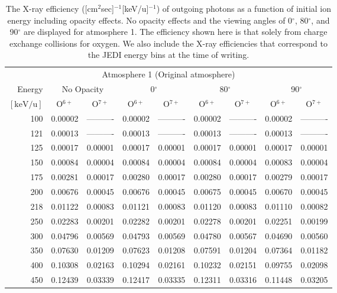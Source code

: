 \begin{table}[ht]
    \centering
    \caption{The X-ray efficiency ([cm$^2$sec]$^{-1}$[keV/u]$^{-1}$) of outgoing photons as a function of initial ion energy including opacity effects. No opacity effects and the viewing angles of 0$^\circ$, 80$^\circ$, and 90$^\circ$ are displayed for atmosphere 1. The efficiency shown here is that solely from charge exchange collisions for oxygen. We also include the X-ray efficiencies that correspond to the JEDI energy bins at the time of writing.}
    \begin{tabular}{r|c|c|c|c|c|c|c|c}
    \multicolumn{9}{c}{Atmosphere 1 (Original atmosphere)} \\ \cline{2-9}
    Energy & \multicolumn{2}{c|}{No Opacity} & \multicolumn{2}{c|}{0$^\circ$} & \multicolumn{2}{c|}{80$^\circ$} & \multicolumn{2}{c}{90$^\circ$} \\ \cline{2-9}
    $\mathrm{[keV/u]}$ & O$^{6+}$ & O$^{7+}$ & O$^{6+}$ & O$^{7+}$ & O$^{6+}$ & O$^{7+}$ & O$^{6+}$ & O$^{7+}$ \\ \cline{1-9}
      100 & 0.00002 & ---------- & 0.00002 & ---------- & 0.00002 & ---------- & 0.00002 & ---------- \\
      121 & 0.00013 & ---------- & 0.00013 & ---------- & 0.00013 & ---------- & 0.00013 & ---------- \\
      125 & 0.00017 & 0.00001 & 0.00017 & 0.00001 & 0.00017 & 0.00001 & 0.00017 & 0.00001 \\
      150 & 0.00084 & 0.00004 & 0.00084 & 0.00004 & 0.00084 & 0.00004 & 0.00083 & 0.00004 \\
      175 & 0.00281 & 0.00017 & 0.00280 & 0.00017 & 0.00280 & 0.00017 & 0.00279 & 0.00017 \\
      200 & 0.00676 & 0.00045 & 0.00676 & 0.00045 & 0.00675 & 0.00045 & 0.00670 & 0.00045 \\
      218 & 0.01122 & 0.00083 & 0.01121 & 0.00083 & 0.01120 & 0.00083 & 0.01110 & 0.00082 \\
      250 & 0.02283 & 0.00201 & 0.02282 & 0.00201 & 0.02278 & 0.00201 & 0.02251 & 0.00199 \\
      300 & 0.04796 & 0.00569 & 0.04793 & 0.00569 & 0.04780 & 0.00567 & 0.04690 & 0.00560 \\
      350 & 0.07630 & 0.01209 & 0.07623 & 0.01208 & 0.07591 & 0.01204 & 0.07364 & 0.01182 \\
      400 & 0.10308 & 0.02163 & 0.10294 & 0.02161 & 0.10232 & 0.02151 & 0.09755 & 0.02098 \\
      450 & 0.12439 & 0.03339 & 0.12417 & 0.03335 & 0.12311 & 0.03316 & 0.11448 & 0.03205 \\

\end{tabular}
\end{table}
